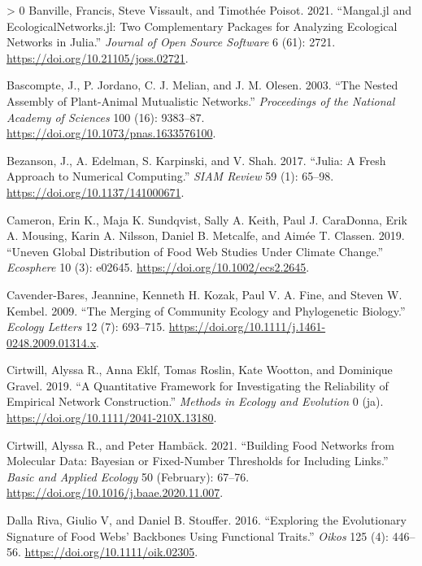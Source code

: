 \documentclass[10pt,oneside]{article}
\newlength{\cslhangindent}
\newenvironment{CSLReferences}[3] %
 {%
  \setlength{\parindent}{0pt}
  \ifodd #1 \everypar{\setlength{\hangindent}{\cslhangindent}}\ignorespaces\fi
  \ifnum #2 > 0
  \setlength{\parskip}{#2\baselineskip}
  \fi
 }%
 {}
\begin{document}
\hypertarget{refs}{}
\begin{CSLReferences}{1}{0}
\leavevmode\hypertarget{ref-Banville2021ManJl}{}%
Banville, Francis, Steve Vissault, and Timothée Poisot. 2021.
{``Mangal.jl and EcologicalNetworks.jl: Two Complementary Packages for
Analyzing Ecological Networks in Julia.''} \emph{Journal of Open Source
Software} 6 (61): 2721. \url{https://doi.org/10.21105/joss.02721}.

\leavevmode\hypertarget{ref-Bascompte2003NesAss}{}%
Bascompte, J., P. Jordano, C. J. Melian, and J. M. Olesen. 2003. {``The
Nested Assembly of Plant-Animal Mutualistic Networks.''}
\emph{Proceedings of the National Academy of Sciences} 100 (16):
9383--87. \url{https://doi.org/10.1073/pnas.1633576100}.

\leavevmode\hypertarget{ref-Bezanson2017JulFre}{}%
Bezanson, J., A. Edelman, S. Karpinski, and V. Shah. 2017. {``Julia: A
Fresh Approach to Numerical Computing.''} \emph{SIAM Review} 59 (1):
65--98. \url{https://doi.org/10.1137/141000671}.

\leavevmode\hypertarget{ref-Cameron2019UneGlo}{}%
Cameron, Erin K., Maja K. Sundqvist, Sally A. Keith, Paul J. CaraDonna,
Erik A. Mousing, Karin A. Nilsson, Daniel B. Metcalfe, and Aimée T.
Classen. 2019. {``Uneven Global Distribution of Food Web Studies Under
Climate Change.''} \emph{Ecosphere} 10 (3): e02645.
\url{https://doi.org/10.1002/ecs2.2645}.

\leavevmode\hypertarget{ref-Cavender-Bares2009MerCom}{}%
Cavender-Bares, Jeannine, Kenneth H. Kozak, Paul V. A. Fine, and Steven
W. Kembel. 2009. {``The Merging of Community Ecology and Phylogenetic
Biology.''} \emph{Ecology Letters} 12 (7): 693--715.
\url{https://doi.org/10.1111/j.1461-0248.2009.01314.x}.

\leavevmode\hypertarget{ref-Cirtwill2019QuaFra}{}%
Cirtwill, Alyssa R., Anna Eklf, Tomas Roslin, Kate Wootton, and
Dominique Gravel. 2019. {``A Quantitative Framework for Investigating
the Reliability of Empirical Network Construction.''} \emph{Methods in
Ecology and Evolution} 0 (ja).
\url{https://doi.org/10.1111/2041-210X.13180}.

\leavevmode\hypertarget{ref-Cirtwill2021BuiFoo}{}%
Cirtwill, Alyssa R., and Peter Hambäck. 2021. {``Building Food Networks
from Molecular Data: Bayesian or Fixed-Number Thresholds for Including
Links.''} \emph{Basic and Applied Ecology} 50 (February): 67--76.
\url{https://doi.org/10.1016/j.baae.2020.11.007}.

\leavevmode\hypertarget{ref-DallaRiva2016ExpEvo}{}%
Dalla Riva, Giulio V, and Daniel B. Stouffer. 2016. {``Exploring the
Evolutionary Signature of Food Webs' Backbones Using Functional
Traits.''} \emph{Oikos} 125 (4): 446--56.
\url{https://doi.org/10.1111/oik.02305}.


\end{CSLReferences}
\end{document}
